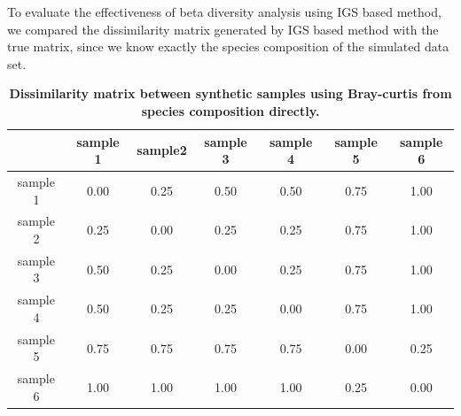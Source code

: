 \documentclass{article}
\begin{document}
To evaluate the effectiveness of beta diversity analysis using IGS based method, 
we compared the dissimilarity matrix generated by IGS based method with the 
true matrix, since we know exactly the species composition of the 
simulated data set.


\begin{table}[!ht]
\centering
\begin{tabular}{|c|c|c|c|c|c|c|}
\hline
                  & sample 1 & sample2 & sample 3 & sample 4 & sample 5 & sample 6 \\ \hline
sample 1 & 0.00              & 0.25             & 0.50              & 0.50              & 0.75              & 1.00              \\ 
sample 2 & 0.25              & 0.00             & 0.25              & 0.25              & 0.75              & 1.00              \\ 
sample 3 & 0.50              & 0.25             & 0.00              & 0.25              & 0.75              & 1.00              \\ 
sample 4 & 0.50              & 0.25             & 0.25              & 0.00              & 0.75              & 1.00              \\ 
sample 5 & 0.75              & 0.75             & 0.75              & 0.75              & 0.00              & 0.25              \\ 
sample 6 & 1.00              & 1.00             & 1.00              & 1.00              & 0.25              & 0.00              \\ \hline
\end{tabular}
\caption{\bf Dissimilarity matrix between synthetic samples using Bray-curtis
from species composition directly. }
\label{table:simulated_real_matrix}
\end{table}
\end{document}
